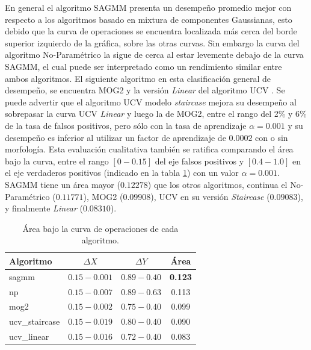 En general el algoritmo SAGMM \cite{chen_vehicle_2012} presenta un desempeño promedio mejor con respecto a los algoritmos basado en mixtura de componentes Gaussianas, esto debido que la curva de operaciones se encuentra localizada más cerca del borde superior izquierdo de la gráfica, sobre las otras curvas. Sin embargo la curva del algoritmo No-Paramétrico \cite{elgammal_nonparametricmodel_2000} la sigue de cerca al estar levemente debajo de la curva SAGMM, el cual puede ser interpretado como un rendimiento similar entre ambos algoritmos. El siguiente algoritmo en esta clasificación general de desempeño, se encuentra MOG2 \cite{zivkovic_efficient_2006} y la versión \textit{Linear} del algoritmo UCV \cite{salvadori_gaussian_2012}. Se puede advertir que el algoritmo UCV modelo \textit{staircase} \cite{salvadori_gaussian_2012} mejora su desempeño al sobrepasar la curva UCV \textit{Linear} y luego la de MOG2, entre el rango del 2\% y 6\% de la tasa de falsos positivos, pero sólo con la tasa de aprendizaje $\alpha=0.001$ y su desempeño es inferior al utilizar un factor de aprendizaje de $0.0002$ con o sin morfología. Esta evaluación cualitativa también se ratifica comparando el área bajo la curva, entre el rango $[0-0.15]$ del eje falsos positivos y $[0.4-1.0]$ en el eje verdaderos positivos (indicado en la tabla \ref{tab:auc}) con un valor $\alpha=0.001$. SAGMM tiene un área mayor ($0.12278$) que los otros algoritmos, continua el No-Paramétrico ($0.11771$), MOG2 ($0.09908$), UCV en su versión \textit{Staircase} ($0.09083$), y finalmente \textit{Linear} ($0.08310$).

\begin{table}[!ht]
\centering
\begin{tabular}{ l | c  | c | c}
\hline
Algoritmo & $\Delta X$ & $\Delta Y$ & Área \\ \hline 
sagmm & $0.15-0.001$ & $0.89-0.40$ & \textbf{0.123} \\
np & $0.15-0.007$ & $0.89-0.63$ & 0.113 \\ 
mog2 & $0.15-0.002$ & $0.75-0.40$ & 0.099 \\
ucv\_staircase & $0.15-0.019$ & $0.80-0.40$ & 0.090 \\
ucv\_linear & $0.15-0.016$ & $0.72-0.40$ & 0.083 \\ \hline
\hline
\end{tabular}
\caption[Área bajo la curva de los algoritmos]{Área bajo la curva de operaciones de cada algoritmo.}
\label{tab:auc}
\end{table}

